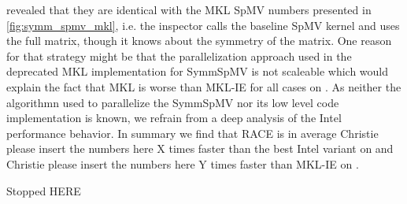  revealed that they are identical with the MKL \acrshort{SpMV} numbers presented in \cref{fig:symm_spmv_mkl}, i.e. the inspector calls the baseline \acrshort{SpMV} kernel and uses the full matrix, though it knows about the symmetry of the matrix. One reason for that strategy might be that the parallelization approach used in the deprecated MKL implementation for \acrshort{SymmSpMV} is not scaleable which would explain the fact that MKL is worse than MKL-IE for all cases on \SKX.  As neither the algorithmn used to parallelize the \acrshort{SymmSpMV} nor its low level code implementation is known, we refrain from a deep analysis of the Intel performance behavior. 
 In summary we find that \acrshort{RACE} is in average {\GW Christie please insert the numbers here X times} faster than the best Intel variant on \IVB and  {\GW Christie please insert the numbers here Y times} faster than MKL-IE on \SKX.


{\GW Stopped HERE} 

